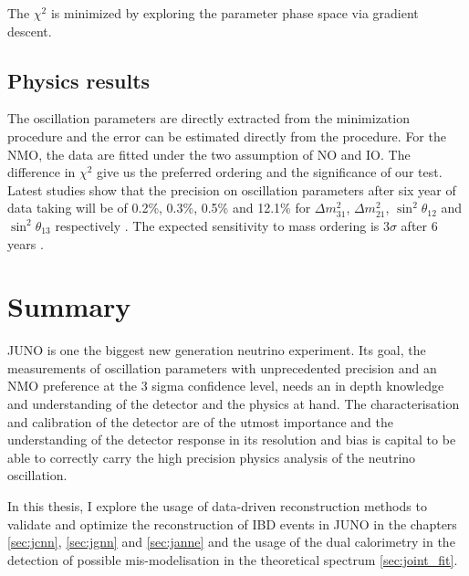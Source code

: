 \documentclass[../main.tex]{subfiles}
\begin{document}
The $\chi^2$ is minimized by exploring the parameter phase space via gradient descent.

\subsection{Physics results}

The oscillation parameters are directly extracted from the minimization procedure and the error can be estimated directly from the procedure. For the NMO, the data are fitted under the two assumption of NO and IO. The difference in $\chi^2$ give us the preferred ordering and the significance of our test. Latest studies show that the precision on oscillation parameters after six year of data taking will be of 0.2\%, 0.3\%, 0.5\% and 12.1\% for $\Delta m^2_{31}$, $\Delta m^2_{21}$, $\sin^2\theta_{12}$ and $\sin^2\theta_{13}$ respectively \cite{juno_collaboration_sub-percent_2022}. The expected sensitivity to mass ordering is $3\sigma$ after 6 years \cite{juno_collaboration_juno_2022}.

\section{Summary}

JUNO is one the biggest new generation neutrino experiment. Its goal, the measurements of oscillation parameters with unprecedented precision and an NMO preference at the 3 sigma confidence level, needs an in depth knowledge and understanding of the detector and the physics at hand. The characterisation and calibration of the detector are of the utmost importance and the understanding of the detector response in its resolution and bias is capital to be able to correctly carry the high precision physics analysis of the neutrino oscillation.

In this thesis, I explore the usage of data-driven reconstruction methods to validate and optimize the reconstruction of IBD events in JUNO in the chapters \ref{sec:jcnn}, \ref{sec:jgnn} and \ref{sec:janne} and the usage of the dual calorimetry in the detection of possible mis-modelisation in the theoretical spectrum \ref{sec:joint_fit}.
\end{document}
